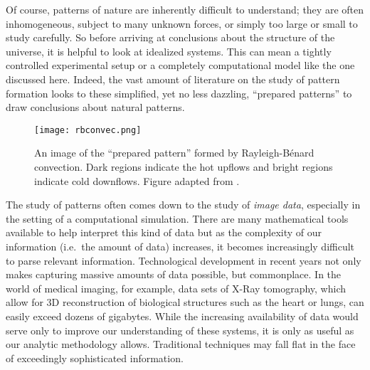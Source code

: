 	Of course, patterns of nature are inherently difficult to understand; they are often inhomogeneous, subject to many unknown forces, or simply too large or small to study carefully. So before arriving at conclusions about the structure of the universe, it is helpful to look at idealized systems. This can mean a tightly controlled experimental setup or a completely computational model like the one discussed here. Indeed, the vast amount of literature on the study of pattern formation looks to these simplified, yet no less dazzling, ``prepared patterns'' to draw conclusions about natural patterns. 
%
\begin{figure}[h]
	\centering
	\texttt{[image: rbconvec.png]}
	\caption{An image of the ``prepared pattern'' formed by Rayleigh-B\'{e}nard convection. Dark regions indicate the hot upflows and bright regions indicate cold downflows. Figure adapted from \protect{}.}
	\label{fig:rbconvec}
\end{figure}
%
	The study of patterns often comes down to the study of \textit{image data}, especially in the setting of a computational simulation. There are many mathematical tools available to help interpret this kind of data but as the complexity of our information (i.e.\ the amount of data) increases, it becomes increasingly difficult to parse relevant information.  Technological development in recent years not only makes capturing massive amounts of data possible, but commonplace. In the world of medical imaging, for example, data sets of X-Ray tomography, which allow for 3D reconstruction of biological structures such as the heart or lungs, can easily exceed dozens of gigabytes. While the increasing availability of data would serve only to improve our understanding of these systems, it is only as useful as our analytic methodology allows. Traditional techniques may fall flat in the face of exceedingly sophisticated information.
	
